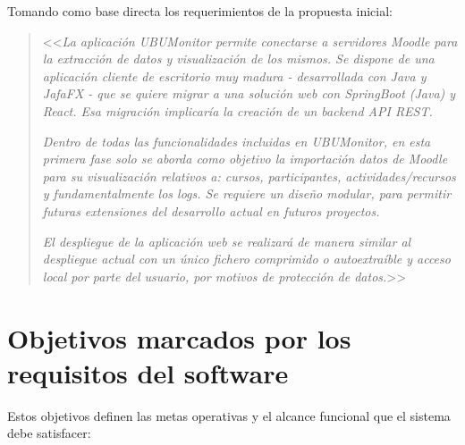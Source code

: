 
Tomando como base directa los requerimientos de la propuesta inicial:

\begin{quote}
    <<\textit{La aplicación UBUMonitor permite conectarse a servidores Moodle para la extracción de datos y visualización de los mismos. Se dispone de una aplicación cliente de escritorio muy madura - desarrollada con Java y JafaFX - que se quiere migrar a una solución web con SpringBoot (Java) y React. Esa migración implicaría la creación de un backend API REST.}

    \textit{Dentro de todas las funcionalidades incluidas en UBUMonitor, en esta primera fase solo se aborda como objetivo la importación datos de Moodle para su visualización relativos a: cursos, participantes, actividades/recursos y fundamentalmente los logs. Se requiere un diseño modular, para permitir futuras extensiones del desarrollo actual en futuros proyectos.}

    \textit{El despliegue de la aplicación web se realizará de manera similar al despliegue actual con un único fichero comprimido o autoextraíble y acceso local por parte del usuario, por motivos de protección de datos.}>>
\end{quote}

\section{Objetivos marcados por los requisitos del software}

Estos objetivos definen las metas operativas y el alcance funcional que el sistema debe satisfacer:

